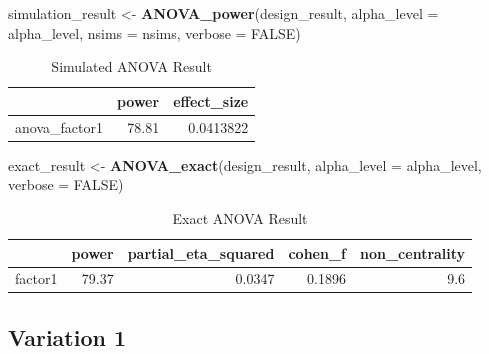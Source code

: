 \documentclass[]{book}
\newenvironment{Shaded}{\begin{snugshade}}{\end{snugshade}}
\newcommand{\DataTypeTok}[1]{\textcolor[rgb]{0.13,0.29,0.53}{#1}}
\newcommand{\KeywordTok}[1]{\textcolor[rgb]{0.13,0.29,0.53}{\textbf{#1}}}
\newcommand{\NormalTok}[1]{#1}
\newcommand{\OtherTok}[1]{\textcolor[rgb]{0.56,0.35,0.01}{#1}}
\newcommand{\StringTok}[1]{\textcolor[rgb]{0.31,0.60,0.02}{#1}}
\begin{document}
\begin{Shaded}
\begin{Highlighting}[]
\NormalTok{simulation_result <-}\StringTok{ }\KeywordTok{ANOVA_power}\NormalTok{(design_result, }
                                 \DataTypeTok{alpha_level =}\NormalTok{ alpha_level, }
                                 \DataTypeTok{nsims =}\NormalTok{ nsims,}
                                 \DataTypeTok{verbose =} \OtherTok{FALSE}\NormalTok{)}
\end{Highlighting}
\end{Shaded}

\begin{table}[!h]

\caption{\label{tab:unnamed-chunk-53}Simulated ANOVA Result}
\centering
\begin{tabular}{l|r|r}
\hline
  & power & effect\_size\\
\hline
anova\_factor1 & 78.81 & 0.0413822\\
\hline
\end{tabular}
\end{table}

\begin{Shaded}
\begin{Highlighting}[]
\NormalTok{exact_result <-}\StringTok{ }\KeywordTok{ANOVA_exact}\NormalTok{(design_result,}
                            \DataTypeTok{alpha_level =}\NormalTok{ alpha_level,}
                            \DataTypeTok{verbose =} \OtherTok{FALSE}\NormalTok{)}
\end{Highlighting}
\end{Shaded}

\begin{table}[!h]

\caption{\label{tab:unnamed-chunk-55}Exact ANOVA Result}
\centering
\begin{tabular}{l|r|r|r|r}
\hline
  & power & partial\_eta\_squared & cohen\_f & non\_centrality\\
\hline
factor1 & 79.37 & 0.0347 & 0.1896 & 9.6\\
\hline
\end{tabular}
\end{table}

\hypertarget{variation-1}{%
\subsection{Variation 1}\label{variation-1}}
\end{document}
